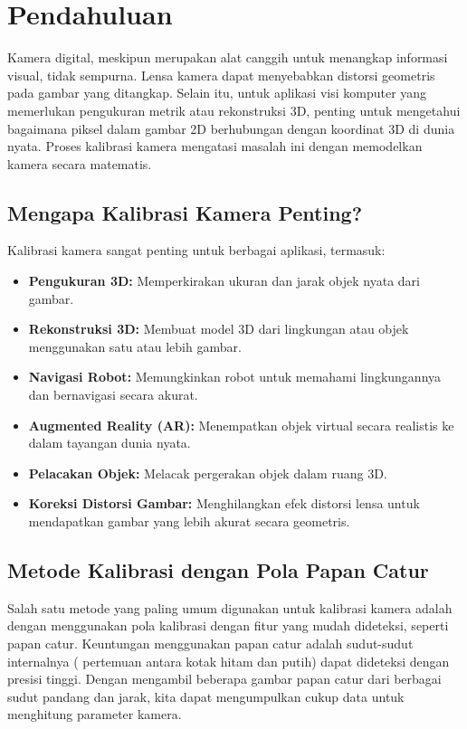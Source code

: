 \documentclass[12pt,a4paper]{article}
\begin{document}
\section{Pendahuluan}
Kamera digital, meskipun merupakan alat canggih untuk menangkap informasi
visual, tidak sempurna. Lensa kamera dapat menyebabkan distorsi geometris pada
gambar yang ditangkap. Selain itu, untuk aplikasi visi komputer yang memerlukan
pengukuran metrik atau rekonstruksi 3D, penting untuk mengetahui bagaimana
piksel dalam gambar 2D berhubungan dengan koordinat 3D di dunia nyata. Proses
kalibrasi kamera mengatasi masalah ini dengan memodelkan kamera secara
matematis.

\subsection{Mengapa Kalibrasi Kamera Penting?}
Kalibrasi kamera sangat penting untuk berbagai aplikasi, termasuk:
\begin{itemize}
    \item \textbf{Pengukuran 3D:} Memperkirakan ukuran dan jarak objek nyata dari gambar.
    \item \textbf{Rekonstruksi 3D:} Membuat model 3D dari lingkungan atau objek menggunakan satu atau lebih gambar.
    \item \textbf{Navigasi Robot:} Memungkinkan robot untuk memahami lingkungannya dan bernavigasi secara akurat.
    \item \textbf{Augmented Reality (AR):} Menempatkan objek virtual secara realistis ke dalam tayangan dunia nyata.
    \item \textbf{Pelacakan Objek:} Melacak pergerakan objek dalam ruang 3D.
    \item \textbf{Koreksi Distorsi Gambar:} Menghilangkan efek distorsi lensa untuk mendapatkan gambar yang lebih akurat secara geometris.
\end{itemize}

\subsection{Metode Kalibrasi dengan Pola Papan Catur}
Salah satu metode yang paling umum digunakan untuk kalibrasi kamera adalah
dengan menggunakan pola kalibrasi dengan fitur yang mudah dideteksi, seperti
papan catur. Keuntungan menggunakan papan catur adalah sudut-sudut internalnya
( pertemuan antara kotak hitam dan putih) dapat dideteksi dengan presisi
tinggi. Dengan mengambil beberapa gambar papan catur dari berbagai sudut
pandang dan jarak, kita dapat mengumpulkan cukup data untuk menghitung
parameter kamera.
\end{document}
